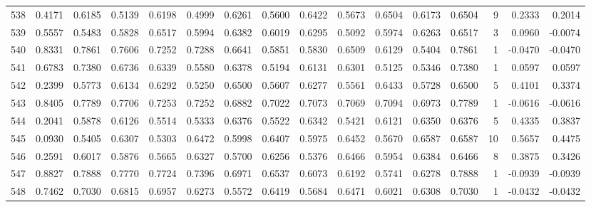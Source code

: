 \begin{tabular}{lrrrrrrrrrrrrrrr}
538 &      0.4171 &  0.6185 &  0.5139 &  0.6198 &  0.4999 &  0.6261 &  0.5600 &  0.6422 &  0.5673 &  0.6504 &   0.6173 &     0.6504 &      9 &                    0.2333 &                     0.2014 \\
539 &      0.5557 &  0.5483 &  0.5828 &  0.6517 &  0.5994 &  0.6382 &  0.6019 &  0.6295 &  0.5092 &  0.5974 &   0.6263 &     0.6517 &      3 &                    0.0960 &                    -0.0074 \\
540 &      0.8331 &  0.7861 &  0.7606 &  0.7252 &  0.7288 &  0.6641 &  0.5851 &  0.5830 &  0.6509 &  0.6129 &   0.5404 &     0.7861 &      1 &                   -0.0470 &                    -0.0470 \\
541 &      0.6783 &  0.7380 &  0.6736 &  0.6339 &  0.5580 &  0.6378 &  0.5194 &  0.6131 &  0.6301 &  0.5125 &   0.5346 &     0.7380 &      1 &                    0.0597 &                     0.0597 \\
542 &      0.2399 &  0.5773 &  0.6134 &  0.6292 &  0.5250 &  0.6500 &  0.5607 &  0.6277 &  0.5561 &  0.6433 &   0.5728 &     0.6500 &      5 &                    0.4101 &                     0.3374 \\
543 &      0.8405 &  0.7789 &  0.7706 &  0.7253 &  0.7252 &  0.6882 &  0.7022 &  0.7073 &  0.7069 &  0.7094 &   0.6973 &     0.7789 &      1 &                   -0.0616 &                    -0.0616 \\
544 &      0.2041 &  0.5878 &  0.6126 &  0.5514 &  0.5333 &  0.6376 &  0.5522 &  0.6342 &  0.5421 &  0.6121 &   0.6350 &     0.6376 &      5 &                    0.4335 &                     0.3837 \\
545 &      0.0930 &  0.5405 &  0.6307 &  0.5303 &  0.6472 &  0.5998 &  0.6407 &  0.5975 &  0.6452 &  0.5670 &   0.6587 &     0.6587 &     10 &                    0.5657 &                     0.4475 \\
546 &      0.2591 &  0.6017 &  0.5876 &  0.5665 &  0.6327 &  0.5700 &  0.6256 &  0.5376 &  0.6466 &  0.5954 &   0.6384 &     0.6466 &      8 &                    0.3875 &                     0.3426 \\
547 &      0.8827 &  0.7888 &  0.7770 &  0.7724 &  0.7396 &  0.6971 &  0.6537 &  0.6073 &  0.6192 &  0.5741 &   0.6278 &     0.7888 &      1 &                   -0.0939 &                    -0.0939 \\
548 &      0.7462 &  0.7030 &  0.6815 &  0.6957 &  0.6273 &  0.5572 &  0.6419 &  0.5684 &  0.6471 &  0.6021 &   0.6308 &     0.7030 &      1 &                   -0.0432 &                    -0.0432 \\

\end{tabular}
